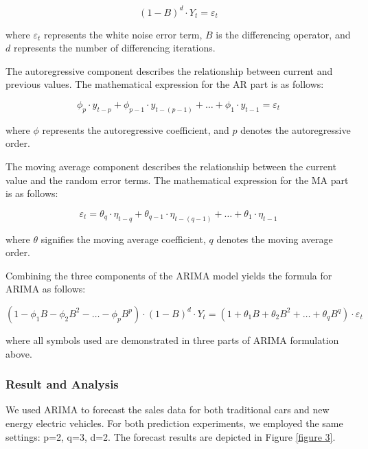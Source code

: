 \documentclass{apmcmthesis}
\begin{document}
\begin{equation}
	(1 - B)^d \cdot Y_t = \varepsilon_t
\end{equation}

where $\varepsilon_t$ represents the white noise error term, $B$ is the differencing operator, and $d$ represents the number of differencing iterations. 

The autoregressive component describes the relationship between current and previous values. The mathematical expression for the AR part is as follows:

\begin{equation}
	\phi_p \cdot y_{t-p} + \phi_{p-1} \cdot y_{t-(p-1)} + \ldots + \phi_1 \cdot y_{t-1} = \varepsilon_t
\end{equation}

where $\phi$ represents the autoregressive coefficient, and $p$ denotes the autoregressive order.

The moving average component describes the relationship between the current value and the random error terms. The mathematical expression for the MA part is as follows:

\begin{equation}
	\varepsilon_t = \theta_q \cdot \eta_{t-q} + \theta_{q-1} \cdot \eta_{t-(q-1)} + \ldots + \theta_1 \cdot \eta_{t-1}
\end{equation}

where $\theta$ signifies the moving average coefficient, $q$ denotes the moving average order.

Combining the three components of the ARIMA model yields the formula for ARIMA as follows:

\begin{equation}
	(1 - \phi_1 B - \phi_2 B^2 - \ldots - \phi_p B^p) \cdot (1 - B)^d \cdot Y_t = (1 + \theta_1 B + \theta_2 B^2 + \ldots + \theta_q B^q) \cdot \varepsilon_t
\end{equation}

where all symbols used are demonstrated in three parts of ARIMA formulation above.

\subsubsection{Result and Analysis}

We used ARIMA to forecast the sales data for both traditional cars and new energy electric vehicles. For both prediction experiments, we employed the same settings: p=2, q=3, d=2. The forecast results are depicted in Figure \ref{figure 3}.
\end{document}
